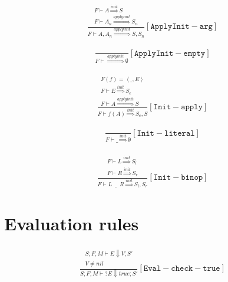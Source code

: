 \documentclass{scrartcl}
\begin{document}
    \begin{align*}
    \frac{
        \begin{matrix}
        F \vdash A \overset{init}{\Rightarrow} S \\
        F \vdash A_n \overset{applyinit}{\Rightarrow} S_n
        \end{matrix}
    }{
        F \vdash A, A_n \overset{applyinit}{\Rightarrow} S, S_n
    }[\mathtt{ApplyInit-arg}]
    \end{align*}
    
    \begin{align*}
    \frac{}{
        F \vdash \overset{applyinit}{\Rightarrow} \emptyset
    }[\mathtt{ApplyInit-empty}]
    \end{align*}
    
    \begin{align*}
    \frac{
        \begin{matrix}
        F(f) = \left< \_, E \right> \\
        F \vdash E \overset{init}{\Rightarrow} S_e \\
        F \vdash A \overset{applyinit}{\Rightarrow} S
        \end{matrix}
    }{
        F \vdash f(A) \overset{init}{\Rightarrow} S_e, S
    }[\mathtt{Init-apply}]
    \end{align*}
    
    \begin{align*}
    \frac{}{
        F \vdash \_ \overset{init}{\Rightarrow} \emptyset
    }[\mathtt{Init-literal}]
    \end{align*}
    
    \begin{align*}
    \frac{
        \begin{matrix}
        F \vdash L \overset{init}{\Rightarrow} S_l \\
        F \vdash R \overset{init}{\Rightarrow} S_r
        \end{matrix}
    }{
        F \vdash L \enspace \_ \enspace R \overset{init}{\Rightarrow} S_l, S_r
    }[\mathtt{Init-binop}]
    \end{align*}

    \section{Evaluation rules}
    
    \begin{align*}
    \frac{
        \begin{matrix}
        S; F; M \vdash E \Downarrow V; S' \\
        V \neq nil
        \end{matrix}
    }{
        S; F; M \vdash ?E \Downarrow true; S'
    }[\mathtt{Eval-check-true}]
    \end{align*}
    
\end{document}
